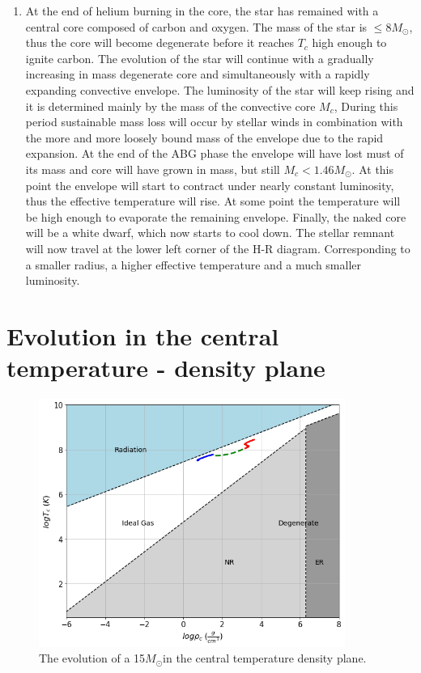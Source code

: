 \documentclass{article}
\newcommand{\msun}{\ensuremath{M_\odot}}
\begin{document}
\begin{enumerate}
    
    \item At the end of helium burning in the core, the star has remained with a central core composed of carbon and oxygen. The mass of the star is $\leq 8 M_{\odot}$, thus the core will become degenerate before it reaches $T_c$ high enough to ignite carbon. The evolution of the star will continue with a gradually increasing in mass degenerate core and simultaneously with a rapidly expanding convective envelope. The luminosity of the star will keep rising and it is determined mainly by the mass of the convective core $M_c$, During this period sustainable mass loss will occur by stellar winds in combination with the more and more loosely bound mass of the envelope due to the rapid expansion. At the end of the ABG phase the envelope will have lost must of its mass and core will have grown in mass, but still $M_c < 1.46 M_{\odot}$. At this point the envelope will start to contract under nearly constant luminosity, thus the effective temperature will rise. At some point the temperature will be high enough to evaporate the remaining envelope. Finally, the naked core will be a white dwarf, which now starts to cool down. The stellar remnant will now travel at the lower left corner of the H-R diagram. Corresponding to a smaller radius, a higher effective temperature and a much smaller luminosity.
    
\end{enumerate}



\section{Evolution in the central temperature - density plane}

\begin{figure}[H]
    \centering
    \includegraphics[width=10cm]{plots/L_rho_diagram.pdf}
    \caption{The evolution of a 15\msun in the central temperature density plane.}
    \label{fig:density}
\end{figure}
\end{document}
